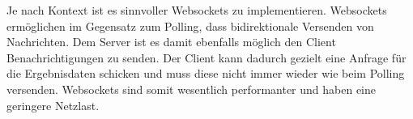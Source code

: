 Je nach Kontext ist es sinnvoller Websockets zu implementieren. Websockets ermöglichen im Gegensatz zum Polling, dass bidirektionale Versenden von Nachrichten. Dem Server ist es damit ebenfalls möglich den Client Benachrichtigungen zu senden. Der Client kann dadurch gezielt eine Anfrage für die Ergebnisdaten schicken und muss diese nicht immer wieder wie beim Polling versenden. Websockets sind somit wesentlich performanter und haben eine geringere Netzlast. \cite*{goll:2020}